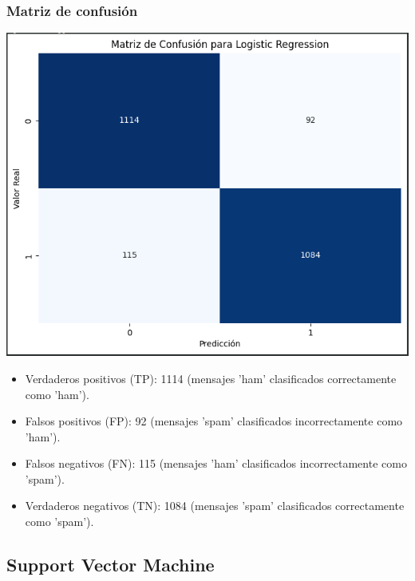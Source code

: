 \subsubsection*{Matriz de confusión}

\begin{center}
    \includegraphics[scale = .4]{IMA/LogisticRegressionMatriz.png}
\end{center}

\begin{itemize}
    \item Verdaderos positivos (TP): 1114 (mensajes 'ham' clasificados correctamente como 'ham').
    \item Falsos positivos (FP): 92 (mensajes 'spam' clasificados incorrectamente como 'ham').
    \item Falsos negativos (FN): 115 (mensajes 'ham' clasificados incorrectamente como 'spam').
    \item Verdaderos negativos (TN): 1084 (mensajes 'spam' clasificados correctamente como 'spam').
\end{itemize}

\subsection{Support Vector Machine }

